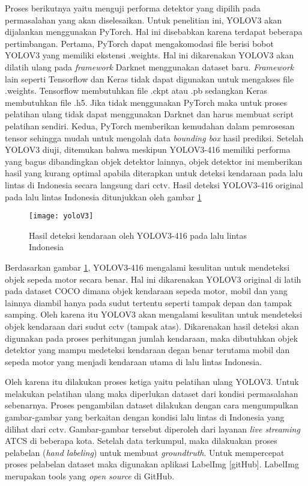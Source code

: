 \documentclass[../thesis.tex]{subfiles}
\begin{document}
Proses berikutnya yaitu menguji performa detektor yang dipilih pada permasalahan yang akan diselesaikan. Untuk penelitian ini, YOLOV3 akan dijalankan menggunakan PyTorch. Hal ini disebabkan karena terdapat beberapa pertimbangan. Pertama, PyTorch dapat mengakomodasi file berisi bobot YOLOV3 yang memiliki ekstensi .weights. Hal ini dikarenakan YOLOV3 akan dilatih ulang pada \textit{framework} Darknet menggunakan dataset baru. \textit{Framework} lain seperti Tensorflow dan Keras tidak dapat digunakan untuk mengakses file .weights. Tensorflow membutuhkan file .ckpt atau .pb sedangkan Keras membutuhkan file .h5. Jika tidak menggunakan PyTorch maka untuk proses pelatihan ulang
tidak dapat menggunakan Darknet dan harus membuat script pelatihan sendiri. Kedua, PyTorch memberikan kemudahan dalam pemrosesan tensor sehingga mudah untuk mengolah data \textit{bounding box} hasil prediksi.
Setelah YOLOV3 diuji, ditemukan bahwa meskipun YOLOV3-416 memiliki performa yang bagus dibandingkan objek detektor lainnya, objek detektor ini memberikan hasil yang kurang optimal apabila diterapkan untuk deteksi kendaraan pada lalu lintas di Indonesia secara langsung dari cctv. Hasil deteksi YOLOV3-416 original pada lalu lintas Indonesia ditunjukkan oleh gambar \ref{yoloV3_ori}

\begin{figure}[htp]
	\centering
	\texttt{[image: yoloV3]}
	\caption{Hasil deteksi kendaraan oleh YOLOV3-416 pada lalu lintas Indonesia}
	\label{yoloV3_ori}
\end{figure}
Berdasarkan gambar \ref{yoloV3_ori}, YOLOV3-416 mengalami kesulitan untuk mendeteksi objek sepeda motor secara benar. Hal ini dikarenakan YOLOV3 original di latih pada dataset COCO dimana objek kendaraan sepeda motor, mobil dan yang lainnya diambil hanya pada sudut tertentu seperti tampak depan dan tampak samping. Oleh karena itu YOLOV3 akan mengalami kesulitan untuk mendeteksi objek kendaraan dari sudut cctv (tampak atas). 
Dikarenakan hasil deteksi akan digunakan pada proses perhitungan jumlah kendaraan, maka dibutuhkan objek detektor yang mampu medeteksi kendaraan degan benar terutama mobil dan sepeda motor yang menjadi kendaraan utama di lalu lintas Indonesia.

Oleh karena itu dilakukan proses ketiga yaitu pelatihan ulang YOLOV3. Untuk melakukan pelatihan ulang maka diperlukan dataset dari kondisi permasalahan sebenarnya. Proses pengambilan dataset dilakukan dengan cara mengumpulkan gambar-gambar yang berkaitan dengan kondisi lalu lintas di Indonesia yang dilihat dari cctv. Gambar-gambar tersebut diperoleh dari layanan \textit{live streaming} ATCS di beberapa kota. 
Setelah data terkumpul, maka dilakuakan proses pelabelan (\textit{hand labeling}) untuk membuat \textit{groundtruth}. Untuk mempercepat proses pelabelan dataset maka digunakan aplikasi LabelImg [gitHub]. LabelImg merupakan tools yang \textit{open source} di GitHub.
\end{document}
